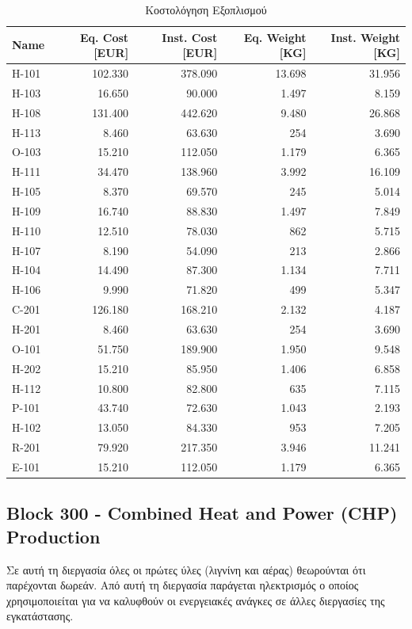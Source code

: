 \documentclass[11pt]{article}
\begin{document}
\begin{table}[htbp]
\caption{Κοστολόγηση Εξοπλισμού}
\centering
\begin{tabular}{lrrrr}
Name & Eq. Cost [EUR] & Inst. Cost [EUR] & Eq. Weight [KG] & Inst. Weight [KG]\\
\hline
H-101 & 102.330 & 378.090 & 13.698 & 31.956\\
H-103 & 16.650 & 90.000 & 1.497 & 8.159\\
H-108 & 131.400 & 442.620 & 9.480 & 26.868\\
H-113 & 8.460 & 63.630 & 254 & 3.690\\
O-103 & 15.210 & 112.050 & 1.179 & 6.365\\
H-111 & 34.470 & 138.960 & 3.992 & 16.109\\
H-105 & 8.370 & 69.570 & 245 & 5.014\\
H-109 & 16.740 & 88.830 & 1.497 & 7.849\\
H-110 & 12.510 & 78.030 & 862 & 5.715\\
H-107 & 8.190 & 54.090 & 213 & 2.866\\
H-104 & 14.490 & 87.300 & 1.134 & 7.711\\
H-106 & 9.990 & 71.820 & 499 & 5.347\\
C-201 & 126.180 & 168.210 & 2.132 & 4.187\\
H-201 & 8.460 & 63.630 & 254 & 3.690\\
O-101 & 51.750 & 189.900 & 1.950 & 9.548\\
H-202 & 15.210 & 85.950 & 1.406 & 6.858\\
H-112 & 10.800 & 82.800 & 635 & 7.115\\
P-101 & 43.740 & 72.630 & 1.043 & 2.193\\
H-102 & 13.050 & 84.330 & 953 & 7.205\\
R-201 & 79.920 & 217.350 & 3.946 & 11.241\\
E-101 & 15.210 & 112.050 & 1.179 & 6.365\\
\end{tabular}
\end{table}

\subsection{Block 300 - Combined Heat and Power (CHP) Production}
\label{sec:org526e1b7}
Σε αυτή τη διεργασία όλες οι πρώτες ύλες (λιγνίνη και αέρας) θεωρούνται
ότι παρέχονται δωρεάν. Από αυτή τη διεργασία παράγεται ηλεκτρισμός ο
οποίος χρησιμοποιείται για να καλυφθούν οι ενεργειακές ανάγκες σε άλλες
διεργασίες της εγκατάστασης.
\end{document}
